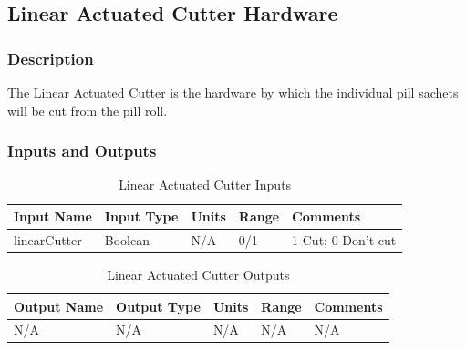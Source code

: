 \documentclass[12pt,titlepage]{article}
\begin{document}

\subsection{Linear Actuated Cutter Hardware }
\subsubsection*{Description}
The Linear Actuated Cutter is the hardware by which the individual pill sachets will be cut from the pill roll.
\subsubsection*{Inputs and Outputs}

\begin{table}[ht!]
\begin{center}
\begin{adjustbox}{max width=\textwidth}
\small
\begin{tabular}{|p{}|p{}|p{}|p{}|p{}|}
 \hline
 \textbf{Input Name} & \textbf{Input Type} & \textbf{Units} &\textbf{Range} & \textbf{Comments} \\
 \hline 
 linearCutter & Boolean & N/A & 0/1 & 1-Cut; 0-Don't cut \\
 \hline
\end{tabular}
\end{adjustbox}
\end{center}
\caption{Linear Actuated Cutter Inputs}
\end{table}

\begin{table}[ht!]
\begin{center}
\begin{adjustbox}{max width=\textwidth}
\small
\begin{tabular}{|p{}|p{}|p{}|p{}|p{}|}
 \hline
 \textbf{Output Name} & \textbf{Output Type} & \textbf{Units} &\textbf{Range} & \textbf{Comments} \\
 \hline 
 N/A & N/A & N/A & N/A & N/A \\
 \hline
\end{tabular}
\end{adjustbox}
\end{center}
\caption{Linear Actuated Cutter Outputs}
\end{table}
\end{document}
